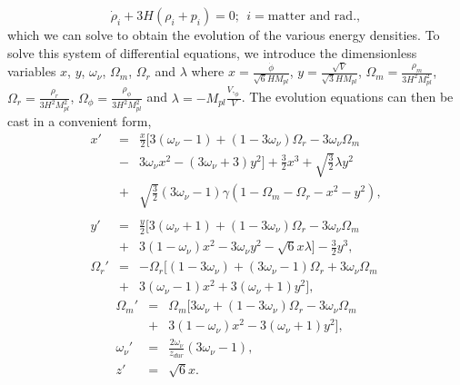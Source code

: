 \documentclass[prd,twocolumn,superscriptaddress]{revtex4}
\begin{document}
\begin{equation}
\dot{\rho}_i + 3 H \left( \rho_i + p_i \right) = 0 ; \ \ i = \mbox{matter and  rad.},
\end{equation}
which we can solve to obtain the evolution of the various energy densities. To solve this system of differential equations,
we introduce the dimensionless variables $x$, $y$, $\omega_{\nu}$, $\Omega_m$, $\Omega_r$ and $\lambda$ where
$x = \frac{\dot{\phi}}{\sqrt{6} H M_{pl}}$, $y = \frac{\sqrt{V}}{\sqrt{3} H M_{pl}}$,
$\Omega_m = \frac{\rho_m}{3 H^2 M_{pl}^2}$, $\Omega_r = \frac{\rho_r}{3 H^2 M_{pl}^2}$,
  $\Omega_{\phi} = \frac{\rho_{\phi}}{3 H^2 M_{pl}^2}$ and $\lambda = - M_{pl} \frac{V,_{\phi}}{V}$.
The evolution  equations can then be cast in a convenient form,
\begin{eqnarray}
x' &=& \frac{x}{2} \Big[ 3 \left( \omega_{\nu} - 1 \right) + \left( 1 - 3 \omega_{\nu} \right) \Omega_r
- 3 \omega_{\nu} \Omega_m \nonumber \\
&-& 3 \omega_{\nu} x^2 - \left( 3 \omega_{\nu} + 3 \right) y^2 \Big]
+ \frac{3}{2} x^3 + \sqrt{\frac{3}{2}} \lambda y^2 \nonumber \\
&+& \sqrt{\frac{3}{2}} \left( 3 \omega_{\nu} - 1 \right) \gamma 
\left( 1 - \Omega_m - \Omega_r - x^2 - y^2 \right) , \nonumber \\ \\
y' &=& \frac{y}{2} \Big[ 3 \left(  \omega_{\nu} + 1 \right) + \left( 1 - 3 \omega_{\nu} \right) \Omega_r
- 3 \omega_{\nu} \Omega_m \nonumber \\
&+& 3 \left( 1 -  \omega_{\nu} \right) x^2 - 3 \omega_{\nu} y^2 - \sqrt{6} x \lambda \Big] - \frac{3}{2} y^3 , \\
\Omega_r ' &=& - \Omega_r \Big[ \left( 1 - 3 \omega_{\nu} \right) + \left( 3 \omega_{\nu} - 1 \right) \Omega_r
+ 3 \omega_{\nu} \Omega_m \nonumber \\
&+& 3 \left( \omega_{\nu} - 1 \right) x^2 + 3 \left( \omega_{\nu} + 1 \right) y^2 \Big],
\end{eqnarray}
\begin{eqnarray}
\Omega_m' &=& \Omega_m \Big[ 3 \omega_{\nu} + \left( 1 - 3 \omega_{\nu} \right) \Omega_r
- 3 \omega_{\nu} \Omega_m \nonumber \\
&+& 3 \left( 1 - \omega_{\nu} \right) x^2 - 3 \left( \omega_{\nu} + 1 \right) y^2 \Big], \\
 \omega_{\nu}' &=& \frac{2 \omega_{\nu}}{z_{dur}} \left(3 \omega_{\nu} - 1\right) ,\\
z' &=& \sqrt{6} x .
\end{eqnarray}
\end{document}
